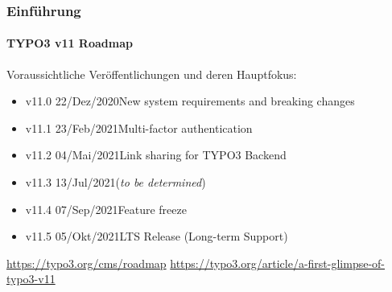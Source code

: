 %

\begin{frame}[fragile]
	\frametitle{Einführung}
	\framesubtitle{TYPO3 v11 Roadmap}

	Voraussichtliche Veröffentlichungen und deren Hauptfokus:

	\begin{itemize}
		\item
			\begingroup
				\color{typo3orange}
				v11.0 \tabto{1.1cm}22/Dez/2020\tabto{3.4cm}New system requirements and breaking changes
			\endgroup
		\item v11.1 \tabto{1.1cm}23/Feb/2021\tabto{3.4cm}Multi-factor authentication
		\item v11.2 \tabto{1.1cm}04/Mai/2021\tabto{3.4cm}Link sharing for TYPO3 Backend
		\item v11.3 \tabto{1.1cm}13/Jul/2021\tabto{3.4cm}(\textit{to be determined})
		\item v11.4 \tabto{1.1cm}07/Sep/2021\tabto{3.4cm}Feature freeze
		\item v11.5 \tabto{1.1cm}05/Okt/2021\tabto{3.4cm}LTS Release (Long-term Support)

	\end{itemize}

	\smaller
		\url{https://typo3.org/cms/roadmap}\newline
		\url{https://typo3.org/article/a-first-glimpse-of-typo3-v11}
	\normalsize

\end{frame}

